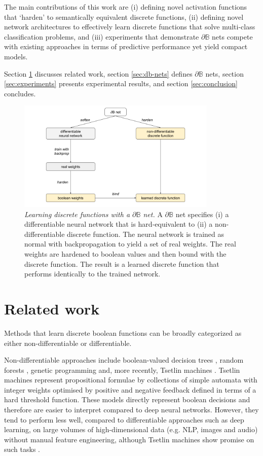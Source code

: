 \documentclass{article} %
\begin{document}
The main contributions of this work are (i) defining novel activation functions that `harden' to semantically equivalent discrete functions, (ii) defining novel network architectures to effectively learn discrete functions that solve multi-class classification problems, and (iii) experiments that demonstrate $\partial \mathbb{B}$ nets compete with existing approaches in terms of predictive performance yet yield compact models.

Section \ref{sec:related-work} discusses related work, section \ref{sec:db-nets} defines $\partial\mathbb{B}$ nets, section \ref{sec:experiments} presents experimental results, and section \ref{sec:conclusion} concludes.

\begin{figure}[h]
	\centering
	\includegraphics[width=0.85\textwidth]{db-net.png}
	\caption{{\em Learning discrete functions with a $\partial\mathbb{B}$ net.} A $\partial \mathbb{B}$ net specifies (i) a differentiable neural network that is hard-equivalent to (ii) a non-differentiable discrete function. The neural network is trained as normal with backpropagation to yield a set of real weights. The real weights are hardened to boolean values and then bound with the discrete function. The result is a learned discrete function that performs identically to the trained network.}
	\label{fig:main-idea}
\end{figure}

\section{Related work}\label{sec:related-work}

Methods that learn discrete boolean functions can be broadly categorized as either non-differentiable or differentiable.

Non-differentiable approaches include boolean-valued decision trees \citep{BreiFrieStonOlsh84}, random forests \citep{598994}, genetic programming \citep{koza1992genetic} and, more recently, Tsetlin machines \cite{granmo18}. Tsetlin machines represent propositional formulae by collections of simple automata with integer weights optimised by positive and negative feedback defined in terms of a hard threshold function. These models directly represent boolean decisions and therefore are easier to interpret compared to deep neural networks. However, they tend to perform less well, compared to differentiable approaches such as deep learning, on large volumes of high-dimensional data (e.g. NLP, images and audio) without manual feature engineering, although Tsetlin machines show promise on such tasks \citep{Granmo2019TheCT}.
\end{document}
